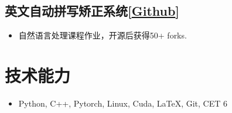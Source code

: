 \documentclass{resume}
\begin{document}
\subsection{英文自动拼写矫正系统[\href{https://github.com/smallflyingpig/projects}{Github}]}
\begin{itemize}
  \item 自然语言处理课程作业，开源后获得50+ forks.
\end{itemize}
\section{技术能力}
\begin{itemize}[parsep=0.2ex]
  \item Python, C++, Pytorch, Linux, Cuda, \LaTeX, Git, CET 6
\end{itemize}

%
%
\end{document}
